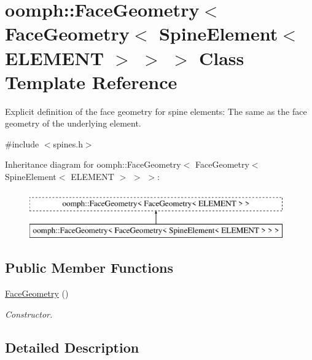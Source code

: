 \hypertarget{classoomph_1_1FaceGeometry_3_01FaceGeometry_3_01SpineElement_3_01ELEMENT_01_4_01_4_01_4}{}\section{oomph\+:\+:Face\+Geometry$<$ Face\+Geometry$<$ Spine\+Element$<$ E\+L\+E\+M\+E\+NT $>$ $>$ $>$ Class Template Reference}
\label{classoomph_1_1FaceGeometry_3_01FaceGeometry_3_01SpineElement_3_01ELEMENT_01_4_01_4_01_4}


Explicit definition of the face geometry for spine elements\+: The same as the face geometry of the underlying element.  




{\ttfamily \#include $<$spines.\+h$>$}

Inheritance diagram for oomph\+:\+:Face\+Geometry$<$ Face\+Geometry$<$ Spine\+Element$<$ E\+L\+E\+M\+E\+NT $>$ $>$ $>$\+:\begin{figure}[H]
\begin{center}
\leavevmode
\includegraphics[height=2.000000cm]{classoomph_1_1FaceGeometry_3_01FaceGeometry_3_01SpineElement_3_01ELEMENT_01_4_01_4_01_4}
\end{center}
\end{figure}
\subsection*{Public Member Functions}
\begin{DoxyCompactItemize}
\item 
\hyperlink{classoomph_1_1FaceGeometry_3_01FaceGeometry_3_01SpineElement_3_01ELEMENT_01_4_01_4_01_4_a995321d6c1cd85b5d3b2c6d464861af0}{Face\+Geometry} ()
\begin{DoxyCompactList}\small\item\em Constructor. \end{DoxyCompactList}\end{DoxyCompactItemize}


\subsection{Detailed Description}
